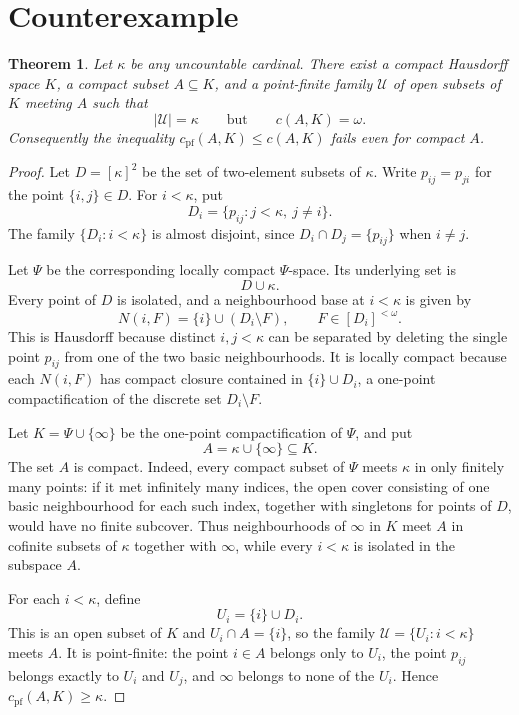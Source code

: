 \documentclass[11pt]{article}
\newtheorem{theorem}{Theorem}
\newcommand{\cf}{c_{\mathrm{pf}}}
\newcommand{\calU}{\mathcal U}
\begin{document}
\section*{Counterexample}

\begin{theorem}
Let $\kappa$ be any uncountable cardinal.  There exist a compact Hausdorff
space $K$, a compact subset $A\subseteq K$, and a point-finite family
$\calU$ of open subsets of $K$ meeting $A$ such that
\[
  |\calU|=\kappa
  \qquad\text{but}\qquad
  c(A,K)=\omega .
\]
Consequently the inequality $\cf(A,K)\le c(A,K)$ fails even for compact
$A$.
\end{theorem}

\begin{proof}
Let $D=[\kappa]^2$ be the set of two-element subsets of $\kappa$.  Write
$p_{ij}=p_{ji}$ for the point $\{i,j\}\in D$.  For $i<\kappa$, put
\[
  D_i=\{p_{ij}:j<\kappa,\ j\ne i\}.
\]
The family $\{D_i:i<\kappa\}$ is almost disjoint, since
$D_i\cap D_j=\{p_{ij}\}$ when $i\ne j$.

Let $\Psi$ be the corresponding locally compact $\Psi$-space.  Its underlying
set is
\[
  D\cup \kappa .
\]
Every point of $D$ is isolated, and a neighbourhood base at $i<\kappa$ is
given by
\[
  N(i,F)=\{i\}\cup (D_i\setminus F),
  \qquad F\in[D_i]^{<\omega}.
\]
This is Hausdorff because distinct $i,j<\kappa$ can be separated by deleting
the single point $p_{ij}$ from one of the two basic neighbourhoods.  It is
locally compact because each $N(i,F)$ has compact closure contained in
$\{i\}\cup D_i$, a one-point compactification of the discrete set
$D_i\setminus F$.

Let $K=\Psi\cup\{\infty\}$ be the one-point compactification of $\Psi$, and
put
\[
  A=\kappa\cup\{\infty\}\subseteq K .
\]
The set $A$ is compact.  Indeed, every compact subset of $\Psi$ meets
$\kappa$ in only finitely many points: if it met infinitely many indices,
the open cover consisting of one basic neighbourhood for each such index,
together with singletons for points of $D$, would have no finite subcover.
Thus neighbourhoods of $\infty$ in $K$ meet $A$ in cofinite subsets of
$\kappa$ together with $\infty$, while every $i<\kappa$ is isolated in the
subspace $A$.

For each $i<\kappa$, define
\[
  U_i=\{i\}\cup D_i .
\]
This is an open subset of $K$ and $U_i\cap A=\{i\}$, so the family
$\calU=\{U_i:i<\kappa\}$ meets $A$.  It is point-finite: the point $i\in A$
belongs only to $U_i$, the point $p_{ij}$ belongs exactly to $U_i$ and
$U_j$, and $\infty$ belongs to none of the $U_i$.  Hence
$\cf(A,K)\ge\kappa$.


\end{proof}
\end{document}
